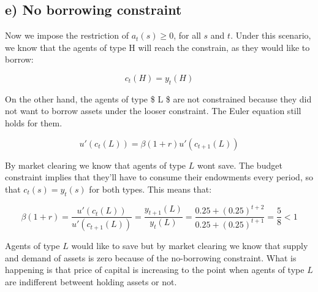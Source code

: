 \documentclass[11pt]{article}
\makeatletter
\newcommand{\boxspacing}{\kern\kvtcb@left@rule\kern\kvtcb@boxsep}
\newcommand{\prompt}[4]{
        \ttfamily\llap{{\color{#2}[#3]:\hspace{3pt}#4}}\vspace{-\baselineskip}
    }
\makeatother
\begin{document}
    \hypertarget{e-no-borrowing-constraint}{%
\subsection{e) No borrowing
constraint}\label{e-no-borrowing-constraint}}

Now we impose the restriction of \(a_t(s) \geq0\), for all \(s\) and
\(t\). Under this scenario, we know that the agents of type H will reach
the constrain, as they would like to borrow:

\[
c_t(H) = y_t(H)
\]

On the other hand, the agents of type \$ L \$ are not constrained
because they did not want to borrow assets under the looser constraint.
The Euler equation still holds for them.

\[
u'(c_t(L)) = \beta (1+r) u'(c_{t+1}(L))
\]

By market clearing we know that agents of type \(L\) wont save. The
budget constraint implies that they'll have to consume their endowments
every period, so that \(c_t(s)=y_t(s)\) for both types. This means that:

\[
\beta (1+r) =  \frac{u'(c_t(L))}{u'(c_{t+1}(L))} = \frac{y_{t+1}(L)}{y_t(L)} = \frac{0.25+(0.25)^{t+2}}{0.25+(0.25)^{t+1}}=\frac{5}{8} < 1
\]

Agents of type \(L\) would like to save but by market clearing we know
that supply and demand of assets is zero because of the no-borrowing
constraint. What is happening is that price of capital is increasing to
the point when agents of type \(L\) are indifferent betweent holding
assets or not.

    \begin{tcolorbox}[breakable, size=fbox, boxrule=1pt, pad at break*=1mm,colback=cellbackground, colframe=cellborder]
\prompt{In}{incolor}{ }{\boxspacing}
\begin{Verbatim}[commandchars=\\\{\}]

\end{Verbatim}
\end{tcolorbox}


    
    
    
\end{document}
